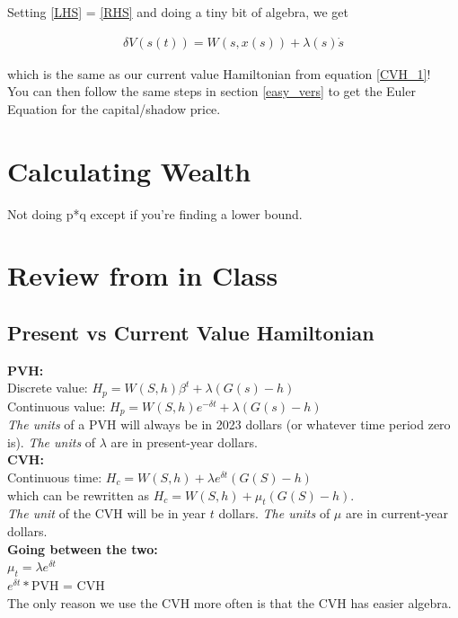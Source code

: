 \documentclass[12pt]{article}
\begin{document}
Setting \ref{LHS} = \ref{RHS} and doing a tiny bit of algebra, we get 


\begin{align}
    \delta V(s(t)) = W(s, x(s)) + \lambda(s) \dot s 
    \label{hamil}
\end{align}

which is the same as our current value Hamiltonian from equation \ref{CVH_1}! \\

You can then follow the same steps in section  \ref{easy_vers} to get the Euler Equation for the capital/shadow price. 

\section{Calculating Wealth}
Not doing p*q except if you're finding a lower bound. 


\section{Review from in Class}

\subsection{Present vs Current Value Hamiltonian}
\textbf{PVH:}  \\
Discrete value: $H_p = W(S, h) \beta^t + \lambda (G(s) -h)$\\
Continuous value: $H_p = W(S, h) e^{-\delta t} + \lambda (G(s) -h)$\\
\textit{The units} of a PVH will always be in 2023 dollars (or whatever time period zero is). \textit{The units} of $\lambda$ are in present-year dollars. \\


\textbf{CVH:}\\
Continuous time: $ H_c = W(S, h) + \lambda e^{\delta t} (G(S) - h)$\\
which can be rewritten as $H_c = W(S,h) + \mu_t (G(S) - h).$\\
\textit{The unit} of the CVH will be in year $t$ dollars. \textit{The units} of $\mu$ are in current-year dollars. \\

\textbf{Going between the two:}\\
$\mu_t = \lambda e^{\delta t}$\\
$e^{\delta t} * $PVH =  CVH\\
The only reason we use the CVH more often is that the CVH has easier algebra. \\
\end{document}
